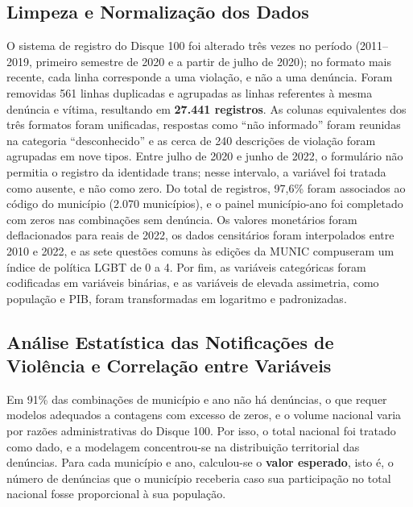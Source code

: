 \documentclass[12pt]{article}
\begin{document}
\subsection{Limpeza e Normalização dos Dados}

O sistema de registro do Disque 100 foi alterado três vezes no período (2011--2019, primeiro semestre de 2020 e a partir de julho de 2020); no formato mais recente, cada linha corresponde a uma violação, e não a uma denúncia. Foram removidas 561 linhas duplicadas e agrupadas as linhas referentes à mesma denúncia e vítima, resultando em \textbf{27.441 registros}. As colunas equivalentes dos três formatos foram unificadas, respostas como ``não informado'' foram reunidas na categoria ``desconhecido'' e as cerca de 240 descrições de violação foram agrupadas em nove tipos. Entre julho de 2020 e junho de 2022, o formulário não permitia o registro da identidade trans; nesse intervalo, a variável foi tratada como ausente, e não como zero. Do total de registros, 97,6\% foram associados ao código do município (2.070 municípios), e o painel município-ano foi completado com zeros nas combinações sem denúncia. Os valores monetários foram deflacionados para reais de 2022, os dados censitários foram interpolados entre 2010 e 2022, e as sete questões comuns às edições da MUNIC compuseram um índice de política LGBT de 0 a 4. Por fim, as variáveis categóricas foram codificadas em variáveis binárias, e as variáveis de elevada assimetria, como população e PIB, foram transformadas em logaritmo e padronizadas.

\subsection{Análise Estatística das Notificações de Violência e Correlação entre Variáveis}

Em 91\% das combinações de município e ano não há denúncias, o que requer modelos adequados a contagens com excesso de zeros, e o volume nacional varia por razões administrativas do Disque 100. Por isso, o total nacional foi tratado como dado, e a modelagem concentrou-se na distribuição territorial das denúncias. Para cada município e ano, calculou-se o \textbf{valor esperado}, isto é, o número de denúncias que o município receberia caso sua participação no total nacional fosse proporcional à sua população.
\end{document}

